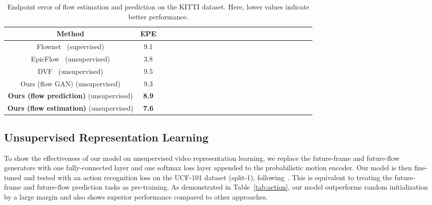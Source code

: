 \documentclass[10pt,twocolumn,letterpaper]{article}
\begin{document}
	\begin{table}[!tp]
		\centering\renewcommand{}\footnotesize
		\caption{Endpoint error of flow estimation and prediction on the KITTI dataset. Here, lower values indicate better performance. }\label{tab:flow}
		\begin{tabular}{c|cccccccccccccccccccccp{6em}p{5em}}
			\toprule
			Method & EPE\\
			\hline
			Flownet~\cite{fischer2015flownet}  (supervised) & 9.1\\
			\hline
			EpicFlow~\cite{revaud2015epicflow} (unsupervised) & 3.8\\
			\hline
			DVF~\cite{liu2017video} (unsupervised) & 9.5\\
			\hline
			{Ours (flow GAN)} (unsupervised) & {9.3}\\
			\hline
			\textbf{Ours (flow prediction)} (unsupervised) & \textbf{8.9}\\
			\textbf{Ours (flow estimation)} (unsupervised) & \textbf{7.6}\\
			\bottomrule
		\end{tabular}%
		\vspace{-7mm}
	\end{table}%
	
	\subsection{Unsupervised Representation Learning}
	
	To show the effectiveness of our model on unsupervised video representation learning, we replace the future-frame and future-flow generators with one fully-connected layer and one softmax loss layer appended to the probabilistic motion encoder. Our model is then fine-tuned and tested with an action recognition loss on the UCF-101 dataset (split-1), following~\cite{mathieu2015deep,liu2017video}. This is equivalent to treating the future-frame and future-flow prediction tasks as pre-training. As demonstrated in Table~\ref{tab:action}, our model outperforms random initialization by a large margin and also shows superior performance compared to other approaches.
	
\end{document}
